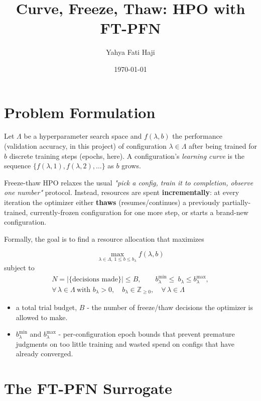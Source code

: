 \documentclass[10pt]{article}
\title{Curve, Freeze, Thaw: HPO with FT-PFN}
\author{Yahya Fati Haji}
\date{\today}
\begin{document}
\maketitle

\section*{Problem Formulation}

Let $\Lambda$ be a hyperparameter search space and $f(\lambda, b)$ the performance (validation
accuracy, in this project) of configuration $\lambda \in \Lambda$ after being trained for $b$ discrete
training steps (epochs, here). A configuration's \textit{learning curve} is the sequence
$\{f(\lambda, 1), f(\lambda, 2), …\}$ as $b$ grows.

Freeze-thaw HPO relaxes the usual \textit{"pick a config, train it to completion, observe one
number"} protocol. Instead, resources are spent \textbf{incrementally}: at every iteration
the optimizer either \textbf{thaws} (resumes/continues) a previously partially-trained,
currently-frozen configuration for one more step, or starts a brand-new configuration.

Formally, the goal is to find a resource allocation that maximizes

$$
\max_{\lambda \in \Lambda,\ 1 \le b \le b_\lambda} f(\lambda, b)
$$
subject to
\begin{align*}
    N = |\{\text{decisions made}\}| \le B, \qquad
    b_\lambda^{\min} \le\  b_\lambda \le b_\lambda^{\max}, \\
    \forall\, \lambda \in \Lambda \ \text{with } b_\lambda > 0, \quad
    b_\lambda \in \mathbb{Z}_{\ge 0}, \quad
    \forall\, \lambda \in \Lambda
\end{align*}

\begin{itemize}
    \item a total trial budget, $B$ - the number of freeze/thaw decisions the optimizer is allowed to make.
    \item $b_\lambda^{\min}$ and $b_\lambda^{\max}$ - per-configuration epoch bounds that prevent premature judgments on too
little training and wasted spend on configs that have already converged.
\end{itemize}

\section*{The FT-PFN Surrogate}
\end{document}
